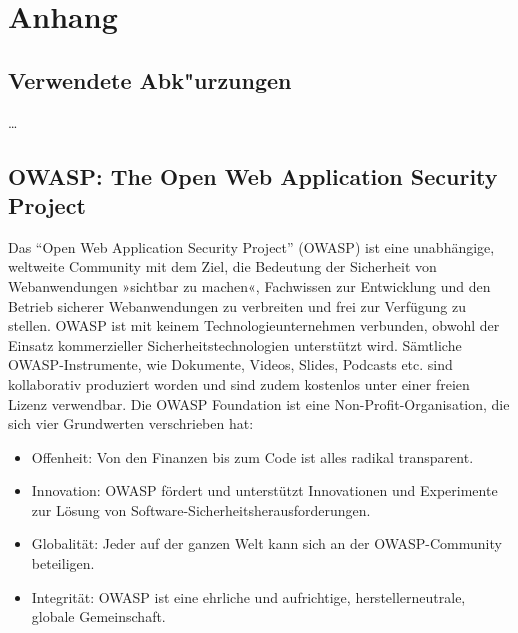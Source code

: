 \documentclass[12pt,oneside,a4paper,parskip]{scrbook}
\begin{document}
\backmatter



\cleardoublepage
{}
{}
\printbibliography[title=Quellenverzeichnis]

\appendix
  \chapter*{Anhang}

  \section{Verwendete Abk"urzungen}
  \dots{}

  \section{OWASP: The Open Web Application Security Project}
  Das ``Open Web Application Security Project'' (OWASP) ist eine unabhängige, weltweite Community mit dem Ziel, die Bedeutung der Sicherheit von Webanwendungen »sichtbar zu machen«, Fachwissen zur Entwicklung und den Betrieb sicherer Webanwendungen zu verbreiten und frei zur Verfügung zu stellen.
  OWASP ist mit keinem Technologieunternehmen verbunden, obwohl der Einsatz kommerzieller Sicherheitstechnologien unterstützt wird. Sämtliche OWASP-Instrumente, wie Dokumente, Videos, Slides, Podcasts etc. sind kollaborativ produziert worden und sind zudem kostenlos unter einer freien Lizenz verwendbar. Die OWASP Foundation ist eine Non-Profit-Organisation, die sich vier Grundwerten verschrieben hat:

  \begin{itemize}
    \item Offenheit: Von den Finanzen bis zum Code ist alles radikal transparent.
    \item Innovation: OWASP fördert und unterstützt Innovationen und Experimente zur Lösung von Software-Sicherheitsherausforderungen.
    \item Globalität: Jeder auf der ganzen Welt kann sich an der OWASP-Community beteiligen.
    \item Integrität: OWASP ist eine ehrliche und aufrichtige, herstellerneutrale, globale Gemeinschaft.
  \end{itemize}
\end{document}

